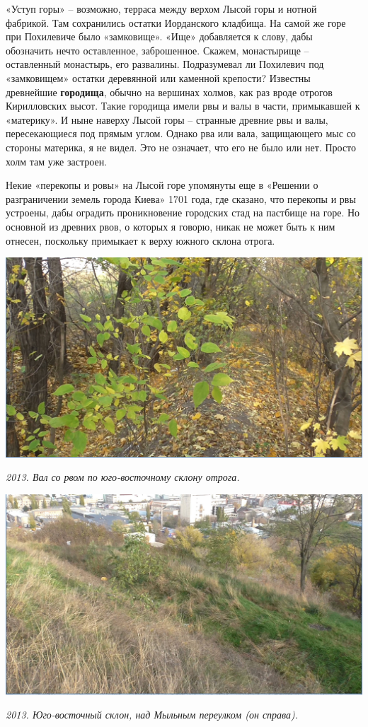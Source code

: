 «Уступ горы» – возможно, терраса между верхом Лысой горы и нотной фабрикой. Там сохранились остатки Иорданского кладбища. На самой же горе при Похилевиче было «замковище». «Ище» добавляется к слову, дабы обозначить нечто оставленное, заброшенное. Скажем, монастырище – оставленный монастырь, его развалины. Подразумевал ли Похилевич под «замковищем» остатки деревянной или каменной крепости? Известны древнейшие \textbf{городища}, обычно на вершинах холмов, как раз вроде отрогов Кирилловских высот. Такие городища имели рвы и валы в части, примыкавшей к «материку». И ныне наверху Лысой горы – странные древние рвы и валы, пересекающиеся под прямым углом. Однако рва или вала, защищающего мыс со стороны материка, я не видел. Это не означает, что его не было или нет. Просто холм там уже застроен.

Некие «перекопы и ровы» на Лысой горе упомянуты еще в «Решении о разграничении земель города Киева» 1701 года, где сказано, что перекопы и рвы устроены, дабы оградить проникновение городских стад на пастбище на горе. Но основной из древних рвов, о которых я говорю, никак не может быть к ним отнесен, поскольку примыкает к верху южного склона отрога.

\begin{center}
\includegraphics[width=0.95\linewidth]{chast-kirvys/lys02/lg03.jpg}

\textit{2013. Вал со рвом по юго-восточному склону отрога.}
\end{center}

\newpage
\vspace*{\fill}
\begin{center}
\includegraphics[width=\linewidth]{chast-kirvys/lys02/lg02.jpg}

\textit{2013. Юго-восточный склон, над Мыльным переулком (он справа).}
\end{center}

